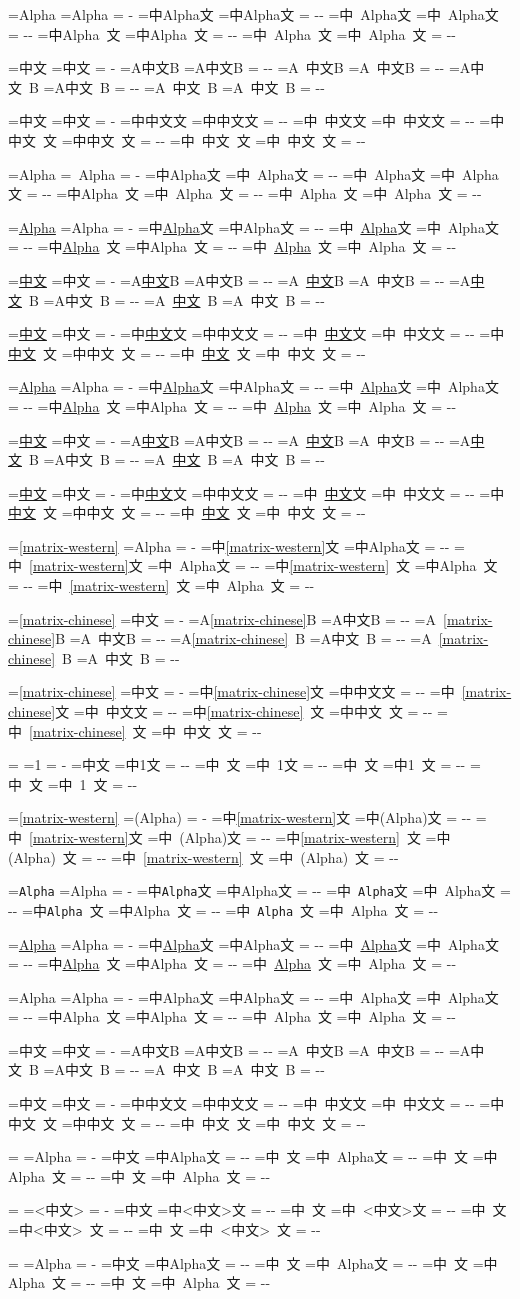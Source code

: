 \documentclass{article}
\makeatletter
\newcommand\MatrixVariant[3]{%
  \MatrixReset\setbox\MatrixCandidateContext=\hbox{#2}%
  \MatrixReset\setbox\MatrixOracleContext=\hbox{#3}%
  \MatrixDelta=\dimexpr
    \wd\MatrixCandidateContext-\wd\MatrixOracleContext-
    \MatrixIntrinsicDelta\relax
  \ifdim\MatrixDelta<0pt \MatrixDelta=-\MatrixDelta\fi
  \ifdim\MatrixDelta<0.01pt
    \typeout{MATRIX|\MatrixLabel|#1|PASS|delta=\the\MatrixDelta}%
  \else
    \typeout{MATRIX|\MatrixLabel|#1|FAIL|delta=\the\MatrixDelta}%
  \fi
}
\newcommand\Matrix[5]{%
  \def\MatrixLabel{#1}%
  \MatrixReset\setbox\MatrixCandidate=\hbox{#3}%
  \MatrixReset\setbox\MatrixOracle=\hbox{#4}%
  \MatrixIntrinsicDelta=\dimexpr
    \wd\MatrixCandidate-\wd\MatrixOracle\relax
  \MatrixVariant{00}{#2#3#5}{#2#4#5}%
  \MatrixVariant{10}{#2 #3#5}{#2 #4#5}%
  \MatrixVariant{01}{#2#3 #5}{#2#4 #5}%
  \MatrixVariant{11}{#2 #3 #5}{#2 #4 #5}%
}
\newcommand\HDtarget{\HD@target}
\makeatother
\begin{document}
\Matrix{post-null/W/CWC}{中}{Alpha\null}{Alpha}{文}
\Matrix{post-null/C/WCW}{A}{中文\null}{中文}{B}
\Matrix{post-null/C/CCC}{中}{中文\null}{中文}{文}
\Matrix{post-null-explicit-glue/W/CWC}{中}
  {\hskip 7pt\null Alpha}{\hskip 7pt Alpha}{文}

\Matrix{hyperref/W/CWC}{中}{\hyperref[matrix-western]{Alpha}}{Alpha}{文}
\Matrix{hyperref/C/WCW}{A}{\hyperref[matrix-chinese]{中文}}{中文}{B}
\Matrix{hyperref/C/CCC}{中}{\hyperref[matrix-chinese]{中文}}{中文}{文}
\Matrix{href/W/CWC}{中}{\href{https://example.com}{Alpha}}{Alpha}{文}
\Matrix{href/C/WCW}{A}{\href{https://example.com}{中文}}{中文}{B}
\Matrix{href/C/CCC}{中}{\href{https://example.com}{中文}}{中文}{文}

\Matrix{ref-hyper/W/CWC}{中}{\ref{matrix-western}}{Alpha}{文}
\Matrix{ref-hyper/C/WCW}{A}{\ref{matrix-chinese}}{中文}{B}
\Matrix{ref-hyper/C/CCC}{中}{\ref{matrix-chinese}}{中文}{文}
\Matrix{pageref-hyper/W/CWC}{中}{\pageref{matrix-western}}{1}{文}
\Matrix{eqref-hyper/W/CWC}{中}{\eqref{matrix-western}}{(Alpha)}{文}

\Matrix{nolinkurl/W/CWC}{中}{\nolinkurl{Alpha}}{Alpha}{文}
\Matrix{url/W/CWC}{中}{\url{Alpha}}{Alpha}{文}

\Matrix{HDtarget-before-W/CWC}{中}{\HDtarget Alpha}{Alpha}{文}
\Matrix{HDtarget-before-C/WCW}{A}{\HDtarget 中文}{中文}{B}
\Matrix{HDtarget-before-C/CCC}{中}{\HDtarget 中文}{中文}{文}
\Matrix{meta-W/CWC}{中}{}{Alpha}{文}
\Matrix{meta-Carg/CWC}{中}{}{<中文>}{文}
\Matrix{cs/CWC}{中}{}{Alpha}{文}
\end{document}
